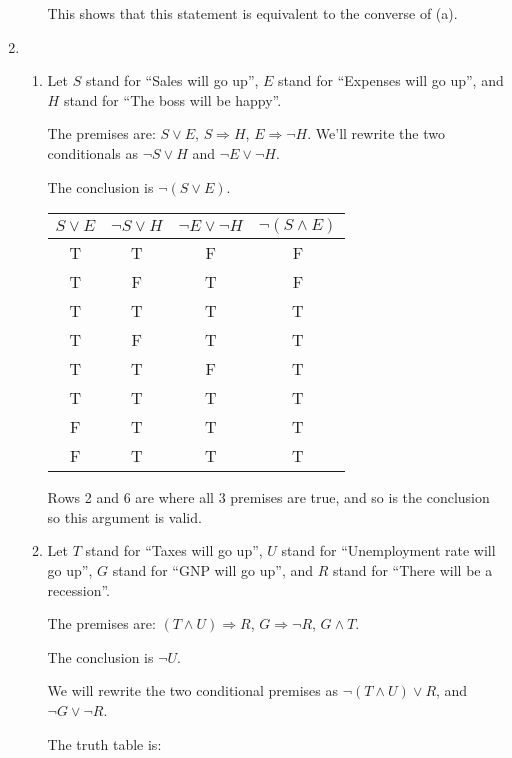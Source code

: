 \documentclass{article}
\begin{document}
\begin{enumerate}
\begin{enumerate}
    This shows that this statement is equivalent to the converse of (a).
  \end{enumerate}

\item
  \begin{enumerate}
  \item
    Let $S$ stand for ``Sales will go up'', $E$ stand for ``Expenses will go up'', and $H$ stand for ``The boss will be happy''.

    The premises are: $S \lor E$, $S \Rightarrow H$, $E \Rightarrow \lnot H$.  We'll rewrite the two conditionals as $\lnot S \lor H$ and $\lnot E \lor \lnot H$.

    The conclusion is $\lnot (S \lor E)$.

    \begin{tabular}{c c c c}
      $S \lor E$ & $\lnot S \lor H$ & $\lnot E \lor \lnot H$ & $\lnot (S \land E)$ \\ \hline
      T & T & F & F \\
      T & F & T & F \\
      T & T & T & T \\
      T & F & T & T \\
      T & T & F & T \\
      T & T & T & T \\
      F & T & T & T \\
      F & T & T & T \\
    \end{tabular}

    Rows 2 and 6 are where all 3 premises are true, and so is the conclusion so this argument is valid.

  \item
    Let $T$ stand for ``Taxes will go up'', $U$ stand for ``Unemployment rate will go up'', $G$ stand for ``GNP will go up'', and $R$ stand for ``There will be a recession''.

    The premises are: $(T \land U) \Rightarrow R$, $G \Rightarrow \lnot R$, $G \land T$.

    The conclusion is $\lnot U$.

    We will rewrite the two conditional premises as $\lnot (T \land U) \lor R$, and $\lnot G \lor \lnot R$.

    \pagebreak

    The truth table is:


\end{enumerate}
\end{enumerate}
\end{document}
